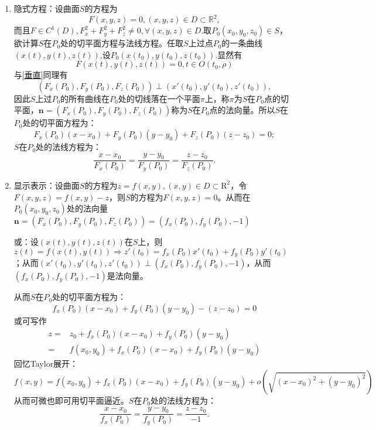 \documentclass[UTF8]{ctexart}
\begin{document}
    \begin{enumerate}[(1)]
        \item 隐式方程：设曲面$S$的方程为
        $$F(x,y,z)=0,(x,y,z)\in D\subset\mathbb{R}^2,$$
        而且$F\in C^1(D),F_x^2+F_y^2+F_z^2\not=0,\forall(x,y,z)\in D$.取$P_0(x_0,y_0,z_0)\in S$，欲计算$S$在$P_0$处的切平面方程与法线方程。任取$S$上过点$P_0$的一条曲线$(x(t),y(t),z(t))$,设$P_0(x(t_0),y(t_0),z(t_0))$.显然有
        $$F(x(t),y(t),z(t))=0,t\in O(t_0,\rho)$$与\ref{垂直}同理有
        $$(F_x(P_0),F_y(P_0),F_z(P_0))\perp(x'(t_0),y'(t_0),z'(t_0)),$$
        因此$S$上过$P_0$的所有曲线在$P_0$处的切线落在一个平面$\pi$上，称$\pi$为$S$在$P_0$点的切平面，$\boldsymbol{n}=(F_x(P_0),F_y(P_0),F_z(P_0))$称为$S$在$P_0$点的法向量。所以$S$在$P_0$处的切平面方程为：
        \begin{equation}
            F_x(P_0)(x-x_0)+F_y(P_0)(y-y_0)+F_z(P_0)(z-z_0)=0;
        \end{equation}
        $S$在$P_0$处的法线方程为：
        \begin{equation}
            \frac{x-x_0}{F_x(P_0)}=\frac{y-y_0}{F_y(P_0)}=\frac{z-z_0}{F_z(P_0)}.
        \end{equation}

        \item 显示表示：设曲面$S$的方程为$z=f(x,y),(x,y)\in D\subset\mathrm{R}^2$，令$F(x,y,z)=f(x,y)-z$，则$S$的方程为$F(x,y,z)=0$。从而在$P_0(x_0,y_0,z_0)$处的法向量$\boldsymbol{n}=(F_x(P_0),F_y(P_0),F_z(P_0))=(f_x(P_0),f_y(P_0),-1)$
        
        或：设$(x(t),y(t),z(t))$在$S$上，则$z(t)=f(x(t),y(t))\Rightarrow z'(t_0)=f_x(P_0)x'(t_0)+f_y(P_0)y'(t_0)$；从而$(x'(t_0),y'(t_0),z'(t_0))\perp(f_x(P_0),f_y(P_0),-1)$，从而$(f_x(P_0),f_y(P_0),-1)$是法向量。

        从而$S$在$P_0$处的切平面方程为：
        \begin{equation}
            f_x(P_0)(x-x_0)+f_y(P_0)(y-y_0)-(z-z_0)=0
        \end{equation}
        或可写作
        \begin{align*}
            z=&z_0+f_x(P_0)(x-x_0)+f_y(P_0)(y-y_0)\\
            =&f(x_0,y_0)+f_x(P_0)(x-x_0)+f_y(P_0)(y-y_0)
        \end{align*}
        回忆Taylor展开：
        \begin{equation}
            f(x,y)=f(x_0,y_0)+f_x(P_0)(x-x_0)+f_y(P_0)(y-y_0)+o(\sqrt{(x-x_0)^2+(y-y_0)^2})
        \end{equation}
        从而可微也即可用切平面逼近。$S$在$P_0$处的法线方程为：
        \begin{equation}
            \frac{x-x_0}{f_x(P_0)}=\frac{y-y_0}{f_y(P_0)}=\frac{z-z_0}{-1}.
        \end{equation}


\end{enumerate}
\end{document}
